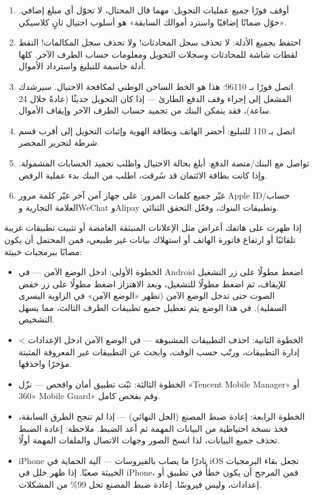 \begin{enumerate}
  \item أوقف فورًا جميع عمليات التحويل: مهما قال المحتال، لا تحوّل أي مبلغ إضافي. «حوّل ضمانًا إضافيًا واسترد أموالك السابقة» هو أسلوب احتيال ثانٍ كلاسيكي.
  \item احتفظ بجميع الأدلة: لا تحذف سجل المحادثات! ولا تحذف سجل المكالمات! التقط لقطات شاشة للمحادثات وسجلات التحويل ومعلومات حساب الطرف الآخر. كلها أدلة حاسمة للتبليغ واسترداد الأموال.
  \item اتصل فورًا بـ 96110: هذا هو الخط الساخن الوطني لمكافحة الاحتيال. سيرشدك المشغل إلى إجراء وقف الدفع الطارئ — إذا كان التحويل حديثًا (عادةً خلال 24 ساعة)، فقد يتمكن البنك من تجميد حساب الطرف الآخر وإيقاف الأموال.
  \item اتصل بـ 110 للتبليغ: أحضر الهاتف وبطاقة الهوية وإثبات التحويل إلى أقرب قسم شرطة لتحرير المحضر.
  \item تواصل مع البنك/منصة الدفع: أبلغ بحالة الاحتيال واطلب تجميد الحسابات المشمولة. وإذا كانت بطاقة الائتمان قد سُرقت، اطلب من البنك بدء عملية الرفض.
  \item غيّر جميع كلمات المرور: على جهاز آمن آخر غيّر كلمة مرور Apple ID/حساب العلامة التجارية وWeChat وAlipay وتطبيقات البنوك، وفعّل التحقق الثنائي.
\end{enumerate}


إذا ظهرت على هاتفك أعراض مثل الإعلانات المنبثقة الغامضة أو تثبيت تطبيقات غريبة تلقائيًا أو ارتفاع فاتورة الهاتف أو استهلاك بيانات غير طبيعي، فمن المحتمل أن يكون مصابًا ببرمجيات خبيثة:

\begin{itemize}
  \item الخطوة الأولى: ادخل الوضع الآمن — في Android اضغط مطولًا على زر التشغيل للإيقاف، ثم اضغط مطولًا للتشغيل، وبعد الاهتزاز اضغط مطولًا على زر خفض الصوت حتى تدخل الوضع الآمن (تظهر «الوضع الآمن» في الزاوية اليسرى السفلية). في هذا الوضع يتم تعطيل جميع تطبيقات الطرف الثالث، مما يسهل التشخيص.
  \item الخطوة الثانية: احذف التطبيقات المشبوهة — في الوضع الآمن ادخل الإعدادات > إدارة التطبيقات، ورتّب حسب الوقت، وابحث عن التطبيقات غير المعروفة المثبتة مؤخرًا واحذفها.
  \item الخطوة الثالثة: ثبّت تطبيق أمان وافحص — نزّل «Tencent Mobile Manager» أو «360 Mobile Guard» وقم بفحص كامل.
  \item الخطوة الرابعة: إعادة ضبط المصنع (الحل النهائي) — إذا لم تنجح الطرق السابقة، فخذ نسخة احتياطية من البيانات المهمة ثم أعد الضبط. ملاحظة: إعادة الضبط تحذف جميع البيانات، لذا انسخ الصور وجهات الاتصال والملفات المهمة أولًا.
  \item iPhone نادرًا ما يصاب بالفيروسات — آلية الحماية في iOS تجعل بقاء البرمجيات الخبيثة صعبًا. إذا ظهر خلل في iPhone، فمن المرجح أن يكون خطأً في تطبيق أو إعدادات، وليس فيروسًا. إعادة ضبط المصنع تحل 99\% من المشكلات.
\end{itemize}

